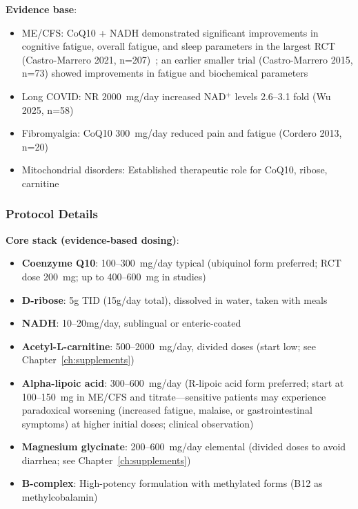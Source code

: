 \textbf{Evidence base}:
\begin{itemize}
    \item ME/CFS: CoQ10 + NADH demonstrated significant improvements in cognitive fatigue, overall fatigue, and sleep parameters in the largest RCT (Castro-Marrero 2021, n=207)~\cite{CastroMarrero2021fatigue}; an earlier smaller trial (Castro-Marrero 2015, n=73) showed improvements in fatigue and biochemical parameters~\cite{CastroMarrero2015}
    \item Long COVID: NR 2000~mg/day increased NAD$^+$ levels 2.6--3.1 fold (Wu 2025, n=58)~\cite{Wu2025NRLongCOVID}
    \item Fibromyalgia: CoQ10 300~mg/day reduced pain and fatigue (Cordero 2013, n=20)~\cite{Cordero2013}
    \item Mitochondrial disorders: Established therapeutic role for CoQ10, ribose, carnitine~\cite{Parikh2009}
\end{itemize}

\subsubsection{Protocol Details}

\textbf{Core stack (evidence-based dosing)}:
\begin{itemize}
    \item \textbf{Coenzyme Q10}: 100--300~mg/day typical (ubiquinol form preferred; RCT dose 200~mg; up to 400--600~mg in studies)
    \item \textbf{D-ribose}: 5g TID (15g/day total), dissolved in water, taken with meals
    \item \textbf{NADH}: 10--20mg/day, sublingual or enteric-coated
    \item \textbf{Acetyl-L-carnitine}: 500--2000~mg/day, divided doses (start low; see Chapter~\ref{ch:supplements})
    \item \textbf{Alpha-lipoic acid}: 300--600~mg/day (R-lipoic acid form preferred; start at 100--150~mg in ME/CFS and titrate---sensitive patients may experience paradoxical worsening (increased fatigue, malaise, or gastrointestinal symptoms) at higher initial doses; clinical observation)
    \item \textbf{Magnesium glycinate}: 200--600~mg/day elemental (divided doses to avoid diarrhea; see Chapter~\ref{ch:supplements})
    \item \textbf{B-complex}: High-potency formulation with methylated forms (B12 as methylcobalamin)
\end{itemize}

